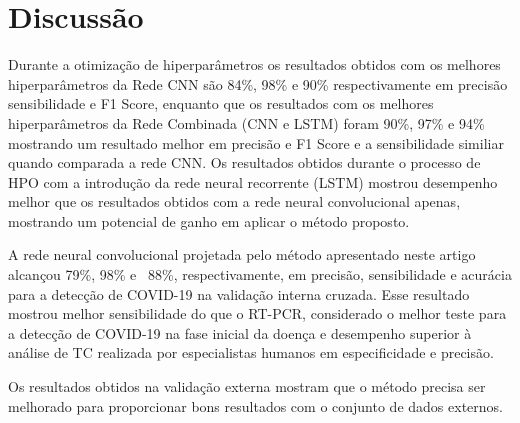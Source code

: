 \chapter{Discussão} \label{cap:cap_discussao}

Durante a otimização de hiperparâmetros os resultados obtidos com os melhores hiperparâmetros da Rede CNN são 84\%, 98\% e 90\% respectivamente em precisão sensibilidade e F1 Score, enquanto que os resultados com os melhores hiperparâmetros da Rede Combinada (CNN e LSTM) foram 90\%, 97\% e 94\% mostrando um resultado melhor em precisão e F1 Score e a sensibilidade similiar quando comparada a rede CNN. Os resultados obtidos durante o processo de HPO com a introdução da rede neural recorrente (LSTM) mostrou desempenho melhor que os resultados obtidos com a rede neural convolucional apenas, mostrando um potencial de ganho em aplicar o método proposto. 

A rede neural convolucional projetada pelo método apresentado neste artigo alcançou 79\%, 98\% e ~88\%, respectivamente, em precisão, sensibilidade e acurácia para a detecção de COVID-19 na validação interna cruzada. Esse resultado mostrou melhor sensibilidade do que o RT-PCR, considerado o melhor teste para a detecção de COVID-19 na fase inicial da doença e desempenho superior à análise de TC realizada por especialistas humanos em especificidade e precisão. 

Os resultados obtidos na validação externa mostram que o método precisa ser melhorado para proporcionar bons resultados com o conjunto de dados externos.


